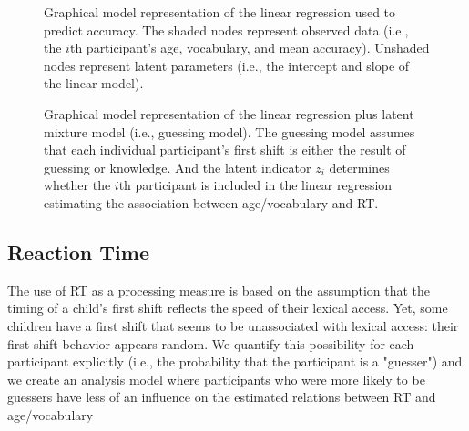 \documentclass[a4paper]{article}
\begin{document}
\begin{figure}[ht]
  \begin{center}
    
  \end{center}
  \caption{Graphical model representation of the linear regression used to predict accuracy. The shaded nodes represent observed data (i.e., the $i$th participant's age, vocabulary, and mean accuracy). Unshaded nodes represent latent parameters (i.e., the intercept and slope of the linear model).}
\end{figure}

\begin{figure}[ht]
  \begin{center}
    
  \end{center}
  \caption{Graphical model representation of the linear regression plus latent mixture model (i.e., guessing model). The guessing model assumes that each individual participant's first shift is either the result of guessing or knowledge. And the latent indicator $z_i$ determines whether the $i$th participant is included in the linear regression estimating the association between age/vocabulary and RT.} 
\end{figure}

\subsection{Reaction Time}

The use of RT as a processing measure is based on the assumption that the timing of a child's first shift reflects the speed of their lexical access. Yet, some children have a first shift that seems to be unassociated with lexical access: their first shift behavior appears random. We quantify this possibility for each participant explicitly (i.e., the probability that the participant is a "guesser") and we create an analysis model where participants who were more likely to be guessers have less of an influence on the estimated relations between RT and age/vocabulary 

\end{document}
